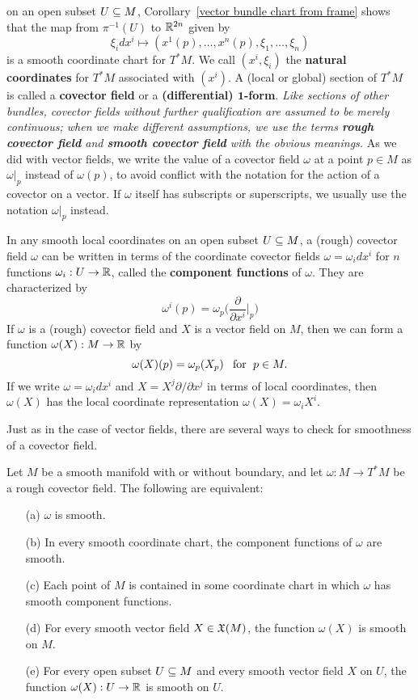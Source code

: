 on an open subset $U\subseteq M$, Corollary~\ref{vector bundle chart from frame} shows that the map from $\pi^{-1}(U)$ to $\mathbb{R}^{2n}$ given by
\[\xi_idx^i\mapsto(x^1(p),\dots,x^n(p),\xi_1,\dots,\xi_n)\]
is a smooth coordinate chart for $T^*M$. We call $(x^i,\xi_i)$ the \textbf{natural coordinates} for $T^*M$ associated with $(x^i)$. A (local or global) section of $T^*M$ is called a \textbf{covector field} or a \textbf{(differential) $\bm{1}$-form}. \textit{Like sections of other bundles, covector fields without further qualification are assumed to be merely continuous; when we make different assumptions, we use the terms \textbf{rough covector field} and \textbf{smooth covector field} with the obvious meanings.} As we did with vector fields, we write the value of a covector field $\omega$ at a point $p\in M$ as $\omega|_p$ instead of $\omega(p)$, to avoid conflict with the notation for the action of a covector on a vector. If $\omega$ itself has subscripts or superscripts, we usually use the notation $\omega|_p$ instead.\par 
In any smooth local coordinates on an open subset $U\subseteq M$, a (rough) covector field $\omega$ can be written in terms of the coordinate covector fields $\omega=\omega_idx^i$ for $n$ functions $\omega_i:U\to\mathbb{R}$, called the \textbf{component functions} of $\omega$. They are characterized by
\[\omega^i(p)=\omega_p\Big(\frac{\partial}{\partial x^i}\Big|_p\Big)\]
If $\omega$ is a (rough) covector field and $X$ is a vector field on $M$, then we can form a function $\omega(X):M\to\mathbb{R}$ by
\[\omega(X)(p)=\omega_p(X_p)\hspace{8pt}\text{for}\hspace{6pt} p\in M.\]
If we write $\omega=\omega_idx^i$ and $X=X^j\partial/\partial x^j$ in terms of local coordinates, then $\omega(X)$ has the local coordinate representation $\omega(X)=\omega_iX^i$.\par
Just as in the case of vector fields, there are several ways to check for smoothness of a covector field.
\begin{proposition}\label{covector field smooth crit}
Let $M$ be a smooth manifold with or without boundary, and let $\omega:M\to T^*M$ be a rough covector field. The following are equivalent:
\begin{itemize}
\item[(a)] $\omega$ is smooth.
\item[(b)] In every smooth coordinate chart, the component functions of $\omega$ are smooth.
\item[(c)] Each point of $M$ is contained in some coordinate chart in which $\omega$ has smooth component functions.
\item[(d)] For every smooth vector field $X\in\mathfrak{X}(M)$, the function $\omega(X)$ is smooth on $M$.
\item[(e)] For every open subset $U\subseteq M$ and every smooth vector field $X$ on $U$, the function $\omega(X):U\to\mathbb{R}$ is smooth on $U$.
\end{itemize}
\end{proposition}
